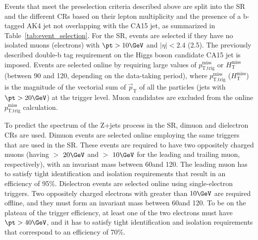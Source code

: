 Events that meet the preselection criteria described above are split into the SR and the different CRs based on their lepton multiplicity and the presence of a b-tagged AK4 jet not overlapping with the CA15 jet, as summarized in Table~\ref{tab:event_selection}. For the SR, events are selected if they have no isolated muons (electrons) with $\pt >10\GeV$ and $|\eta|< 2.4$ (2.5). The previously described double-b tag requirement on the Higgs boson candidate CA15 jet is imposed.
Events are selected online by requiring large values of $p_\text{T,trig}^\text{miss}$ or $H_{\text{T}}^{\text{miss}}$ (between 90 and 120\GeV, depending on the data-taking period), where $p_\text{T,trig}^\text{miss}$  ($H_{\text{T}}^{\text{miss}}$) is the magnitude of the vectorial sum of $\vec{p}_\text{T}$ of all the particles (jets with $\pt>20\GeV$) at the trigger level. Muon candidates are excluded from the online $p_\text{T,trig}^\text{miss}$ calculation.





To predict the \MET spectrum of the Z+jets process in the SR, dimuon and dielectron CRs are used.
Dimuon events are selected online employing the same \MET triggers that are used in the SR.
These events are required to have two oppositely charged muons (having
\pt $>$ $20\GeV$ and \pt $>$ $10\GeV$ for the leading and trailing
muon, respectively), with an invariant mass between 60\GeV and 120\GeV.
The leading muon has to satisfy tight identification and isolation requirements that result in an efficiency of 95\%.
Dielectron events are selected online using single-electron triggers. %
Two oppositely charged electrons with \pt greater than $10\GeV$ are required offline, and they must form an invariant mass between 60\GeV and 120\GeV.
To be on the plateau of the trigger efficiency, at least one of the two electrons must have $\pt>40\GeV$, and it has to satisfy tight identification and isolation requirements that correspond to an efficiency of 70\%.

